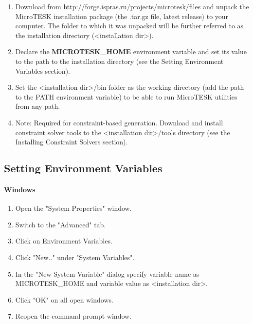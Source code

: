 \documentclass[oneside,final,14pt]{extreport}
\begin{document}
\begin{enumerate}
  \item Download from \url{http://forge.ispras.ru/projects/microtesk/files} and unpack
        the MicroTESK installation package (the .tar.gz file, latest release) to your
        computer. The folder to which it was unpacked will be further referred to as
        the installation directory (<installation dir>).

  \item Declare the \textbf{MICROTESK{\_}HOME} environment variable and set its value to the path to
        the installation directory (see the Setting Environment Variables section).

  \item Set the <installation dir>/bin folder as the working directory (add the path to
        the PATH environment variable) to be able to run MicroTESK utilities from any path.

  \item Note: Required for constraint-based generation. Download and install constraint
        solver tools to the <installation dir>/tools directory (see the Installing
        Constraint Solvers section).
\end{enumerate}


\subsection{Setting Environment Variables}

\paragraph{Windows}

\begin{enumerate}
  \item Open the "System Properties" window.
  \item Switch to the "Advanced" tab.
  \item Click on Environment Variables.
  \item Click "New.." under "System Variables".
  \item In the "New System Variable" dialog specify variable name as
        MICROTESK{\_}HOME and variable value as <installation dir>.
  \item Click "OK" on all open windows.
  \item Reopen the command prompt window.
\end{enumerate}
\end{document}

